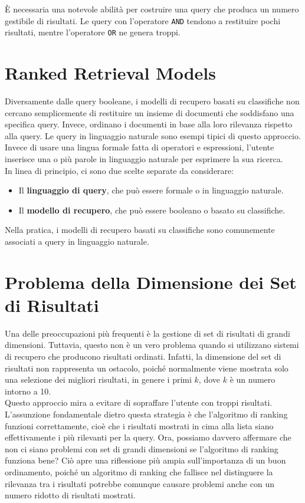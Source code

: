\documentclass{report}
\begin{document}
	È necessaria una notevole abilità per costruire una query che produca un numero gestibile di risultati. Le query con l'operatore \texttt{AND} tendono a restituire pochi risultati, mentre l'operatore \texttt{OR} ne genera troppi.

	\section{Ranked Retrieval Models}
	Diversamente dalle query booleane, i modelli di recupero basati su classifiche non cercano semplicemente di restituire un insieme di documenti che soddisfano una specifica query. Invece, ordinano i documenti in base alla loro rilevanza rispetto alla query. Le query in linguaggio naturale sono esempi tipici di questo approccio. Invece di usare una lingua formale fatta di operatori e espressioni, l'utente inserisce una o più parole in linguaggio naturale per esprimere la sua ricerca.
	\vspace{\baselineskip}\\
	In linea di principio, ci sono due scelte separate da considerare:
	\begin{itemize}
    	\item Il \textbf{linguaggio di query}, che può essere formale o in linguaggio naturale.
    	\item Il \textbf{modello di recupero}, che può essere booleano o basato su classifiche.
	\end{itemize}
	Nella pratica, i modelli di recupero basati su classifiche sono comunemente associati a query in linguaggio naturale.

	\section{Problema della Dimensione dei Set di Risultati}
	Una delle preoccupazioni più frequenti è la gestione di set di risultati di grandi dimensioni. Tuttavia, questo non è un vero problema quando si utilizzano sistemi di recupero che producono risultati ordinati. Infatti, la dimensione del set di risultati non rappresenta un ostacolo, poiché normalmente viene mostrata solo una selezione dei migliori risultati, in genere i primi $k$, dove $k$ è un numero intorno a 10.
	\vspace{\baselineskip}\\
	Questo approccio mira a evitare di sopraffare l'utente con troppi risultati. L'assunzione fondamentale dietro questa strategia è che l'algoritmo di ranking funzioni correttamente, cioè che i risultati mostrati in cima alla lista siano effettivamente i più rilevanti per la query. Ora, possiamo davvero affermare che non ci siano problemi con set di grandi dimensioni se l'algoritmo di ranking funziona bene? Ciò apre una riflessione più ampia sull'importanza di un buon ordinamento, poiché un algoritmo di ranking che fallisce nel distinguere la rilevanza tra i risultati potrebbe comunque causare problemi anche con un numero ridotto di risultati mostrati.
\end{document}
